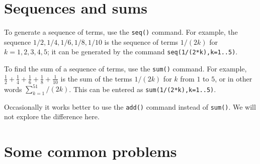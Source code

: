 \documentclass{amsart}
\begin{document}
\section{Sequences and sums}



\begin{secenum}
%
 \item\label{seq} To generate a sequence of terms, use the \verb~seq()~
  command.  For example, the sequence $1/2,1/4,1/6,1/8,1/10$
  is the sequence of terms $1/(2k)$ for $k=1,2,3,4,5$; it can
  be generated by the command \verb~seq(1/(2*k),k=1..5)~. 
%
 \item\label{sum} To find the sum of a sequence of terms, use the
  \verb~sum()~ command.  For example,
  $\tfrac{1}{2}+\tfrac{1}{4}+\tfrac{1}{6}+\tfrac{1}{8}+\tfrac{1}{10}$  
  is the sum of the terms $1/(2k)$ for $k$ from $1$ to $5$,
  or in other words $\sum_{k=1}^51/(2k)$.  This can be
  entered as \verb~sum(1/(2*k),k=1..5)~. 
%
 \item\label{add} Occasionally it works better to use the \verb~add()~
  command instead of \verb~sum()~.  We will not explore the
  difference here. 
\end{secenum}

\section{Some common problems}\label{sec-problems}
\end{document}

